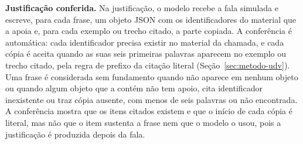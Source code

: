 \textbf{Justificação conferida.} Na justificação, o modelo recebe a fala simulada e escreve, para cada
frase, um objeto JSON com os identificadores do material que a apoia e, para cada exemplo ou trecho
citado, a parte copiada. A conferência é automática: cada identificador precisa existir no material
da chamada, e cada cópia é aceita quando as suas seis primeiras palavras aparecem no exemplo ou trecho
citado, pela regra de prefixo da citação literal (Seção~\ref{sec:metodo-udv}). Uma frase é
considerada sem fundamento quando não aparece em nenhum objeto ou quando algum objeto que a contém não
tem apoio, cita identificador inexistente ou traz cópia ausente, com menos de seis palavras ou não
encontrada. A conferência mostra que os itens citados existem e que o início de cada cópia é literal,
mas não que o item sustenta a frase nem que o modelo o usou, pois a justificação é produzida depois
da fala.
